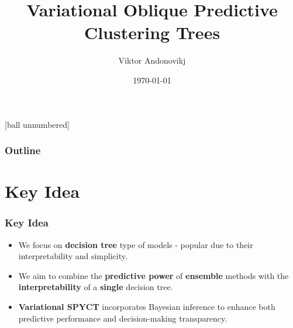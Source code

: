 \documentclass{beamer}
\title{Variational Oblique Predictive Clustering Trees}
\author{Viktor Andonovikj}
\institute{Jožef Stefan Institute \& Jožef Stefan International Postgraduate School}
\date{\today}
\begin{document}
[ball unnumbered]

\begin{frame}[plain]
  \titlepage
\end{frame}

\begin{frame}[plain]
  \frametitle{Outline}

  {\small %
    \setlength{\baselineskip}{10pt} %
    \tableofcontents
  }

\end{frame}


\addtocounter{framenumber}{-2}

\section{Key Idea}
\begin{frame}
  \frametitle{Key Idea}
  \begin{itemize}
    \item We focus on \textbf{decision tree} type of models - popular due to their interpretability and simplicity.
    \item We aim to combine the \textbf{predictive power} of \textbf{ensemble} methods with the \textbf{interpretability} of a \textbf{single} decision tree.
    \item \textbf{Variational SPYCT} incorporates Bayesian inference to enhance both predictive performance and decision-making transparency.
  \end{itemize}
\end{frame}
\end{document}
